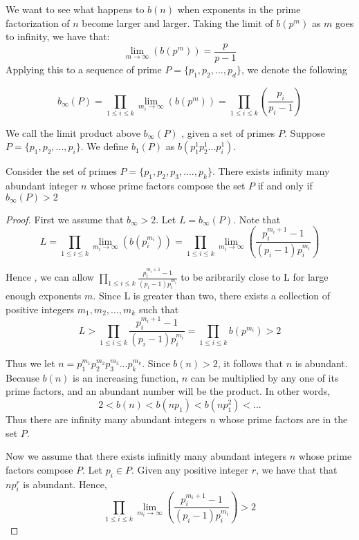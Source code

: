 \documentclass[../paper.tex]{article}
\begin{document}
We want to see what happens to $b(n)$ when exponents in the prime
factorization of $n$ become larger and larger. Taking the limit of
$b(p^m)$ as $m$ goes to infinity, we have that:
$$\lim_{m \rightarrow \infty}(b(p^m)) = \frac{p}{p-1}$$
Applying this to a sequence of prime $P = \{p_1, p_2, ..., p_d\}$,
we denote the following

\begin{equation}\label{b_inf_def}
  b_{\infty}(P) 
  = \prod_{1 \leq i \leq k} \lim_{m_i \rightarrow \infty}(b(p^m))
                = \prod_{1 \leq i \leq k}(\frac{p_i}{p_i - 1})
\end{equation}


We call the limit product above $b_{\infty}(P)$ , given a set of primes
$P$. Suppose $P = \{p_1, p_2, ..., p_i \}$. We define $b_1(P)$ as
$b(p_1^1 p_2^1 ... p_i^1)$.


\begin{theorem}\label{b_inf_1}
Consider the set of primes 
%
$P = \{p_{1}, p_{2}, p_{3}, .... , p_{k}\}$.
%
There exists infinity many abundant integer $n$ whose prime 
factors compose the set $P$  if and only if $b_{\infty}(P) > 2$

\end{theorem}

\begin{proof}

First we assume that $b_\infty > 2$. Let $L = b_\infty(P)$. 
Note that
%  
$$L 
%
= \prod_{1 \leq i \leq k} \lim_{m_i \rightarrow \infty}(b(p_i^{m_i})) 
%
= \prod_{1 \leq i \leq k} \lim_{m_i \rightarrow \infty} 
%
( \frac{p_i^{m_{i} + 1} -1}{(p_i -1)p_{i}^{m_{i}}})$$

Hence , we can allow
$\prod_{1 \leq i \leq k} \frac{p_i^{m_{i} + 1} -1}
{(p_i -1)p_{i}^{m_{i}}}$ to be aribrarily close to L for large 
enough exponents $m$. Since L is greater than two, there exists a
collection of positive integers $m_1, m_2, ... , m_k$ such that 
% 
$$L > \prod_{1 \leq i \leq k} \frac{p_i^{m_{i} + 1} -1}
{(p_i -1)p_{i}^{m_{i}}} = \prod_{1 \leq i \leq k} b(p^{m_i}) > 2$$
%

Thus we let $n=p_1^{m_1}p_2^{m_2}p_3^{m_3}...p_{k}^{m_k}$. 
Since $b(n) > 2$, it follows that $n$ is abundant. 
Because $b(n)$ is an increasing function, $n$ can be multiplied
by any one of its prime factors, and an abundant number 
will be the product. In other words,
%
$$2 < b(n) < b(np_1) < b(np_1^2) < ...$$
%
Thus there are infinity many abundant integers $n$ whose prime
factors are in the set $P$.

Now we assume that there exists infinitly many abundant integers 
$n$ whose prime factors compose $P$. Let $p_i \in P$. Given any
positive integer $r$, we have that that $np_i^r$ is abundant. 
Hence,
%
$$\prod_{1 \leq i \leq k} \lim_{m_i \rightarrow \infty} 
( \frac{p_i^{m_{i} + 1} -1}{(p_i -1)p_{i}^{m_{i}}}) > 2$$

\end{proof}
\end{document}
